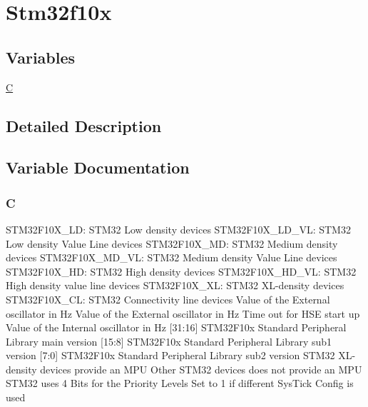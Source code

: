 \hypertarget{group__stm32f10x}{\section{Stm32f10x}
\label{group__stm32f10x}
}
\subsection*{Variables}
\begin{DoxyCompactItemize}
\item 
\hyperlink{group__stm32f10x_gaaa53ca0b650dfd85c4f59fa156f7a2cc}{C}
\end{DoxyCompactItemize}


\subsection{Detailed Description}


\subsection{Variable Documentation}
\hypertarget{group__stm32f10x_gaaa53ca0b650dfd85c4f59fa156f7a2cc}{
\subsubsection[{C}]{\setlength{\rightskip}{0pt plus 5cm}C}}\label{group__stm32f10x_gaaa53ca0b650dfd85c4f59fa156f7a2cc}
S\-T\-M32\-F10\-X\-\_\-\-L\-D\-: S\-T\-M32 Low density devices S\-T\-M32\-F10\-X\-\_\-\-L\-D\-\_\-\-V\-L\-: S\-T\-M32 Low density Value Line devices S\-T\-M32\-F10\-X\-\_\-\-M\-D\-: S\-T\-M32 Medium density devices S\-T\-M32\-F10\-X\-\_\-\-M\-D\-\_\-\-V\-L\-: S\-T\-M32 Medium density Value Line devices S\-T\-M32\-F10\-X\-\_\-\-H\-D\-: S\-T\-M32 High density devices S\-T\-M32\-F10\-X\-\_\-\-H\-D\-\_\-\-V\-L\-: S\-T\-M32 High density value line devices S\-T\-M32\-F10\-X\-\_\-\-X\-L\-: S\-T\-M32 X\-L-\/density devices S\-T\-M32\-F10\-X\-\_\-\-C\-L\-: S\-T\-M32 Connectivity line devices Value of the External oscillator in Hz Value of the External oscillator in Hz Time out for H\-S\-E start up Value of the Internal oscillator in Hz \mbox{[}31\-:16\mbox{]} S\-T\-M32\-F10x Standard Peripheral Library main version \mbox{[}15\-:8\mbox{]} S\-T\-M32\-F10x Standard Peripheral Library sub1 version \mbox{[}7\-:0\mbox{]} S\-T\-M32\-F10x Standard Peripheral Library sub2 version S\-T\-M32 X\-L-\/density devices provide an M\-P\-U Other S\-T\-M32 devices does not provide an M\-P\-U S\-T\-M32 uses 4 Bits for the Priority Levels Set to 1 if different Sys\-Tick Config is used 
